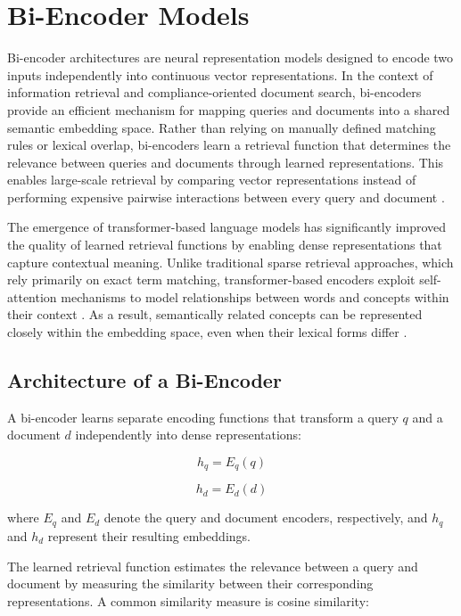 \section{Bi-Encoder Models}

Bi-encoder architectures are neural representation models designed to encode two inputs independently into continuous vector representations. In the context of information retrieval and compliance-oriented document search, bi-encoders provide an efficient mechanism for mapping queries and documents into a shared semantic embedding space. Rather than relying on manually defined matching rules or lexical overlap, bi-encoders learn a retrieval function that determines the relevance between queries and documents through learned representations. This enables large-scale retrieval by comparing vector representations instead of performing expensive pairwise interactions between every query and document \cite{karpukhin2020dense}.

The emergence of transformer-based language models has significantly improved the quality of learned retrieval functions by enabling dense representations that capture contextual meaning. Unlike traditional sparse retrieval approaches, which rely primarily on exact term matching, transformer-based encoders exploit self-attention mechanisms to model relationships between words and concepts within their context \cite{vaswani2017attention}. As a result, semantically related concepts can be represented closely within the embedding space, even when their lexical forms differ \cite{reimers2019sentence}.

\subsection{Architecture of a Bi-Encoder}

A bi-encoder learns separate encoding functions that transform a query $q$ and a document $d$ independently into dense representations:

\begin{equation}
h_q = E_q(q)
\end{equation}

\begin{equation}
h_d = E_d(d)
\end{equation}

where $E_q$ and $E_d$ denote the query and document encoders, respectively, and $h_q$ and $h_d$ represent their resulting embeddings.

The learned retrieval function estimates the relevance between a query and document by measuring the similarity between their corresponding representations. A common similarity measure is cosine similarity:

